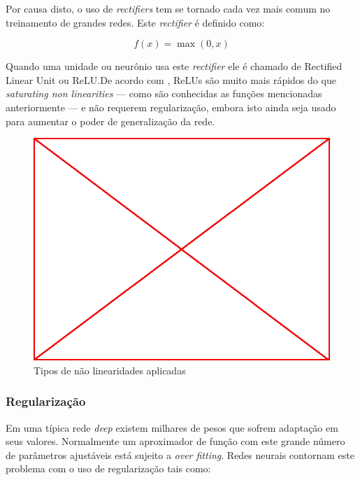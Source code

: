 Por causa disto, o uso de \emph{rectifiers} tem se tornado cada vez mais comum
no treinamento de grandes redes. Este \emph{rectifier} é definido como:

$$ f(x) = \max(0,x) $$

Quando uma unidade ou neurônio usa este \emph{rectifier} ele é chamado de
Rectified Linear Unit ou ReLU.\@ De acordo com \citep{krizhevsky2012imagenet},
ReLUs são muito mais rápidos do que \emph{saturating non linearities} --- como
são conhecidas as funções mencionadas anteriormente --- e não requerem
regularização, embora isto ainda seja usado para aumentar o poder de
generalização da rede.

\begin{figure}
  \caption{Tipos de não linearidades aplicadas}
  \begin{center}
    \includegraphics[scale=0.5]{placeholder}
  \end{center}
\end{figure}

\subsubsection{Regularização}

Em uma típica rede \emph{deep} existem milhares de pesos que sofrem adaptação
em seus valores. Normalmente um aproximador de função com este grande número de
parâmetros ajustáveis está sujeito a \emph{over fitting}. Redes neurais
contornam este problema com o uso de regularização tais como:

